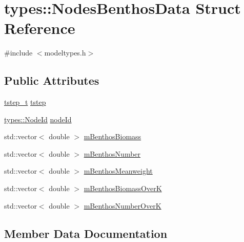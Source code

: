 \hypertarget{structtypes_1_1_nodes_benthos_data}{}\section{types\+::Nodes\+Benthos\+Data Struct Reference}
\label{structtypes_1_1_nodes_benthos_data}


{\ttfamily \#include $<$modeltypes.\+h$>$}

\subsection*{Public Attributes}
\begin{DoxyCompactItemize}
\item 
\mbox{\hyperlink{namespacetypes_a9dc53a5ce11a196d82a6983030de8028}{tstep\+\_\+t}} \mbox{\hyperlink{structtypes_1_1_nodes_benthos_data_a463db001595acfdcd8ec29c67f57dd8b}{tstep}}
\item 
\mbox{\hyperlink{classtypes_1_1_node_id}{types\+::\+Node\+Id}} \mbox{\hyperlink{structtypes_1_1_nodes_benthos_data_ab6776c10f2c1db891ccc39e254af8351}{node\+Id}}
\item 
std\+::vector$<$ double $>$ \mbox{\hyperlink{structtypes_1_1_nodes_benthos_data_a084552f0adcbd17dce65dc29df870572}{m\+Benthos\+Biomass}}
\item 
std\+::vector$<$ double $>$ \mbox{\hyperlink{structtypes_1_1_nodes_benthos_data_a8fc31a198fd22c5ded2de284b9ee9594}{m\+Benthos\+Number}}
\item 
std\+::vector$<$ double $>$ \mbox{\hyperlink{structtypes_1_1_nodes_benthos_data_a96e6f2bcbb20a85c4ad6e2759b49be75}{m\+Benthos\+Meanweight}}
\item 
std\+::vector$<$ double $>$ \mbox{\hyperlink{structtypes_1_1_nodes_benthos_data_a637fc6a44010a25fbdac51109a79de7f}{m\+Benthos\+Biomass\+OverK}}
\item 
std\+::vector$<$ double $>$ \mbox{\hyperlink{structtypes_1_1_nodes_benthos_data_a2466ac4609bb0d01aa9c0e18dd0ca9bb}{m\+Benthos\+Number\+OverK}}
\end{DoxyCompactItemize}


\subsection{Member Data Documentation}
\mbox{\label{structtypes_1_1_nodes_benthos_data_a084552f0adcbd17dce65dc29df870572}} 
